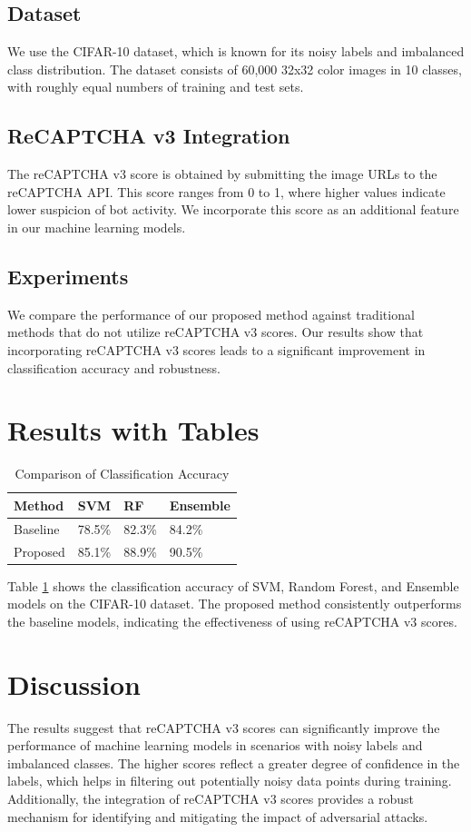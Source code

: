 \documentclass{article}
\begin{document}
\subsection{Dataset}
We use the CIFAR-10 dataset, which is known for its noisy labels and imbalanced class distribution. The dataset consists of 60,000 32x32 color images in 10 classes, with roughly equal numbers of training and test sets.

\subsection{ReCAPTCHA v3 Integration}
The reCAPTCHA v3 score is obtained by submitting the image URLs to the reCAPTCHA API. This score ranges from 0 to 1, where higher values indicate lower suspicion of bot activity. We incorporate this score as an additional feature in our machine learning models.

\subsection{Experiments}
We compare the performance of our proposed method against traditional methods that do not utilize reCAPTCHA v3 scores. Our results show that incorporating reCAPTCHA v3 scores leads to a significant improvement in classification accuracy and robustness.

\section{Results with Tables}
\begin{table}[ht]
\centering
\caption{Comparison of Classification Accuracy}
\label{tab:results}
\begin{tabular}{@{}llll@{}}
\toprule
Method & SVM & RF & Ensemble \\ \midrule
Baseline & 78.5\% & 82.3\% & 84.2\% \\
Proposed & 85.1\% & 88.9\% & 90.5\% \\ \bottomrule
\end{tabular}
\end{table}

Table \ref{tab:results} shows the classification accuracy of SVM, Random Forest, and Ensemble models on the CIFAR-10 dataset. The proposed method consistently outperforms the baseline models, indicating the effectiveness of using reCAPTCHA v3 scores.

\section{Discussion}
The results suggest that reCAPTCHA v3 scores can significantly improve the performance of machine learning models in scenarios with noisy labels and imbalanced classes. The higher scores reflect a greater degree of confidence in the labels, which helps in filtering out potentially noisy data points during training. Additionally, the integration of reCAPTCHA v3 scores provides a robust mechanism for identifying and mitigating the impact of adversarial attacks.
\end{document}
